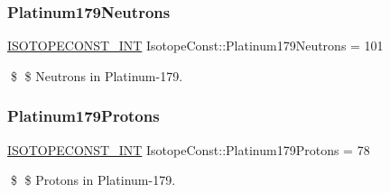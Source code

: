 \subsubsection{\texorpdfstring{Platinum179\+Neutrons}{Platinum179Neutrons}}
{\footnotesize\ttfamily \mbox{\hyperlink{group___isotope_const-_macros_ga5f18360b3e99483a35c32d789e62621c}{I\+S\+O\+T\+O\+P\+E\+C\+O\+N\+S\+T\+\_\+\+I\+NT}} Isotope\+Const\+::\+Platinum179\+Neutrons = 101}

\$ \$ Neutrons in Platinum-\/179. \mbox{\label{group___isotope_const-_platinum-_pt179_ga304e2e7d72b14433f8d87642cfbef8d9}} 
\subsubsection{\texorpdfstring{Platinum179\+Protons}{Platinum179Protons}}
{\footnotesize\ttfamily \mbox{\hyperlink{group___isotope_const-_macros_ga5f18360b3e99483a35c32d789e62621c}{I\+S\+O\+T\+O\+P\+E\+C\+O\+N\+S\+T\+\_\+\+I\+NT}} Isotope\+Const\+::\+Platinum179\+Protons = 78}

\$ \$ Protons in Platinum-\/179. 
